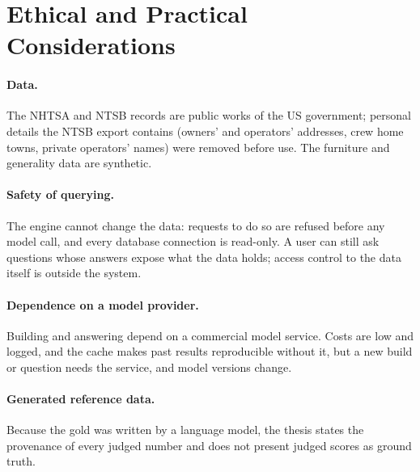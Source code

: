 \section{Ethical and Practical Considerations}\label{sec:ch08-ethics}

\paragraph{Data.} The NHTSA and NTSB records are public works of the US government; personal details the NTSB
export contains (owners' and operators' addresses, crew home towns, private operators' names) were removed before
use. The furniture and generality data are synthetic.

\paragraph{Safety of querying.} The engine cannot change the data: requests to do so are refused before any model
call, and every database connection is read-only. A user can still ask questions whose answers expose what the data
holds; access control to the data itself is outside the system.

\paragraph{Dependence on a model provider.} Building and answering depend on a commercial model service. Costs are
low and logged, and the cache makes past results reproducible without it, but a new build or question needs the
service, and model versions change.

\paragraph{Generated reference data.} Because the gold was written by a language model, the thesis states the
provenance of every judged number and does not present judged scores as ground truth.
